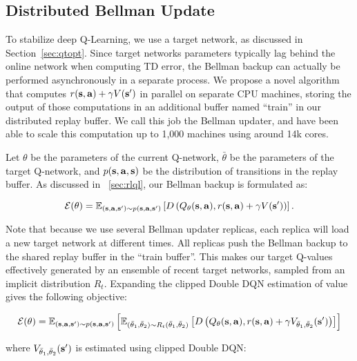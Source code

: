 \documentclass{article}
\begin{document}
\subsection{Distributed Bellman Update}\label{sec:appendix_bellman_update}
To stabilize deep Q-Learning, we use a target network, as discussed in Section~\ref{sec:qtopt}. Since target networks parameters typically lag behind the online network when computing TD error, the Bellman backup can actually be performed asynchronously in a separate process. We propose a novel algorithm that
computes ${r(\mathbf{s},\mathbf{a}) + \gamma V(\mathbf{s}')}$
in parallel on separate CPU machines, storing the output of those computations in an additional buffer named \enquote{train} in our distributed replay buffer. We call this job the Bellman updater, and have been able to scale this computation up to 1,000 machines using around 14k cores.

Let $\theta$ be the parameters of the current Q-network, $\bar{\theta}$ be the parameters of the target Q-network, and $p(\mathbf{s},\mathbf{a},\mathbf{s})$ be the distribution of transitions in the replay buffer. As discussed in ~\ref{sec:rlql}, our Bellman backup is formulated as:

\[
\mathcal{E}(\theta) = \mathbb{E}_{(\mathbf{s},\mathbf{a},\mathbf{s}') \sim p(\mathbf{s},\mathbf{a},\mathbf{s}')} \left[ D \left(
Q_\theta(\mathbf{s},\mathbf{a}) , r(\mathbf{s},\mathbf{a}) + \gamma V(\mathbf{s}') \right)
\right].
\]

Note that because we use several Bellman updater replicas, each replica will load a new target network at different times. All replicas push the Bellman backup to the shared replay buffer in the \enquote{train buffer}. This makes our target Q-values effectively generated by an ensemble of recent target networks, sampled from an implicit distribution $R_t$. Expanding the clipped Double DQN estimation of value gives the following objective:

\begin{equation}
\mathcal{E}(\theta) = \mathbb{E}_{(\mathbf{s},\mathbf{a},\mathbf{s}') \sim p(\mathbf{s},\mathbf{a},\mathbf{s}')} \left[ \mathbb{E}_{(\bar{\theta}_1,\bar{\theta}_2) \sim R_t(\bar{\theta}_1,\bar{\theta}_2)} \left[ D \left(
Q_\theta(\mathbf{s},\mathbf{a}) , r(\mathbf{s},\mathbf{a}) + \gamma V_{\bar{\theta}_1, \bar{\theta}_2}(\mathbf{s}') \right)
\right] \right]
\end{equation}

where $V_{\bar{\theta}_1,\bar{\theta}_2}(\mathbf{s}')$ is estimated using clipped Double DQN:
\end{document}
